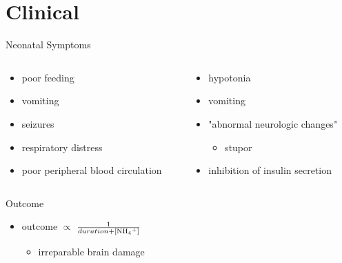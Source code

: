 \documentclass[presentation, smaller]{beamer}
\begin{document}
\section{Clinical}
\label{sec:orgheadline21}
\begin{frame}[label={sec:orgheadline12}]{Neonatal Symptoms}
\begin{columns}
\begin{column}{0.5\columnwidth}
\begin{itemize}
\item poor feeding
\item vomiting
\item seizures
\item respiratory distress
\item poor peripheral blood circulation
\end{itemize}
\end{column}
\begin{column}{0.5\columnwidth}
\begin{itemize}
\item hypotonia
\item vomiting
\item "abnormal neurologic changes"
\begin{itemize}
\item stupor
\end{itemize}
\item inhibition of insulin secretion
\end{itemize}
\end{column}
\end{columns}
\begin{block}{Outcome}
\begin{itemize}
\item outcome \(\propto\) \(\frac{1}{duration + [\ce{NH4+}]}\)
\begin{itemize}
\item irreparable brain damage
\end{itemize}
\end{itemize}
\end{block}
\end{frame}
\end{document}
